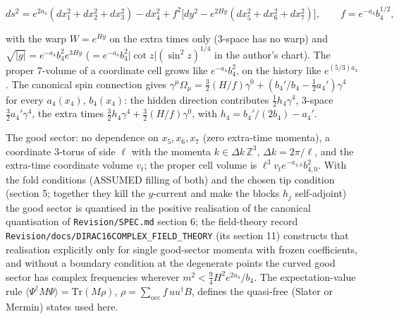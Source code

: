 \documentclass[11pt]{article}
\begin{document}
\[
ds^2 = e^{2a_4}(dx_1^2+dx_2^2+dx_3^2) - dx_4^2 + f^2\big[dy^2 - e^{2Hy}(dx_5^2+dx_6^2+dx_7^2)\big],\qquad f = e^{-a_4}b_4^{1/2},
\]

with the warp $W = e^{Hy}$ on the extra times only (3-space has no warp) and $\sqrt{|g|} = e^{-a_4}b_4^2e^{3Hy}$ ($= e^{-a_4}b_4^2|\cot z|(\sin^2 z)^{1/4}$ in the author's chart). The proper 7-volume of a coordinate cell grows like $e^{-a_4}b_4^2$, on the history like $e^{(5/3)a_4}$. The canonical spin connection gives $\gamma^\mu\Omega_\mu = \tfrac32(H/f)\gamma^0 + (b_4'/b_4 - \tfrac12a_4')\gamma^4$ for every $a_4(x_4)$, $b_4(x_4)$: the hidden direction contributes $\tfrac12h_4\gamma^4$, 3-space $\tfrac32a_4'\gamma^4$, the extra times $\tfrac32h_4\gamma^4 + \tfrac32(H/f)\gamma^0$, with $h_4 = b_4'/(2b_4) - a_4'$.

The good sector: no dependence on $x_5, x_6, x_7$ (zero extra-time momenta), a coordinate 3-torus of side $\ell$ with the momenta $k \in \Delta k\,\mathbb{Z}^3$, $\Delta k = 2\pi/\ell$, and the extra-time coordinate volume $v_t$; the proper cell volume is $\ell^3v_te^{-a_{4,0}}b_{4,0}^2$. With the fold conditions (ASSUMED filling of both) and the chosen tip condition (section 5; together they kill the $y$-current and make the blocks $h_j$ self-adjoint) the good sector is quantised in the positive realisation of the canonical quantisation of \texttt{Revision\allowbreak{}/SPEC.md} section 6; the field-theory record \texttt{Revision\allowbreak{}/docs/DI\allowbreak{}RAC16COM\allowbreak{}PLEX\_FIE\allowbreak{}LD\_THEOR\allowbreak{}Y} (its section 11) constructs that realisation explicitly only for single good-sector momenta with frozen coefficients, and without a boundary condition at the degenerate points the curved good sector has complex frequencies wherever $m^2 < \tfrac94H^2e^{2a_4}/b_4$. The expectation-value rule $\langle\Psi^\dagger M\Psi\rangle = \mathrm{Tr}(M\rho)$, $\rho = \sum_{\mathrm{occ}} f\,uu^\dagger B$, defines the quasi-free (Slater or Mermin) states used here.
\end{document}
